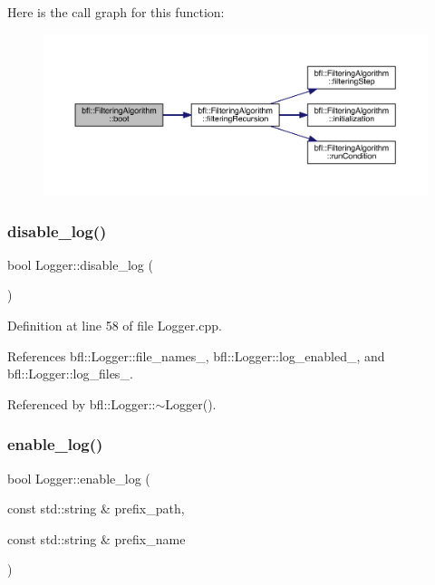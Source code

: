 Here is the call graph for this function\+:
\nopagebreak
\begin{figure}[H]
\begin{center}
\leavevmode
\includegraphics[width=350pt]{classbfl_1_1FilteringAlgorithm_a96651f8464190c0a56d79219a1017147_cgraph}
\end{center}
\end{figure}
\mbox{\label{classbfl_1_1Logger_a440467a28ccc46490d767fe0ef6f556a}} 
\subsubsection{\texorpdfstring{disable\+\_\+log()}{disable\_log()}}
{\footnotesize\ttfamily bool Logger\+::disable\+\_\+log (\begin{DoxyParamCaption}{ }\end{DoxyParamCaption})\hspace{0.3cm}{\ttfamily [inherited]}}



Definition at line 58 of file Logger.\+cpp.



References bfl\+::\+Logger\+::file\+\_\+names\+\_\+, bfl\+::\+Logger\+::log\+\_\+enabled\+\_\+, and bfl\+::\+Logger\+::log\+\_\+files\+\_\+.



Referenced by bfl\+::\+Logger\+::$\sim$\+Logger().

\mbox{\label{classbfl_1_1Logger_ae94b97b6e8d7902e8ce048384813122e}} 
\subsubsection{\texorpdfstring{enable\+\_\+log()}{enable\_log()}}
{\footnotesize\ttfamily bool Logger\+::enable\+\_\+log (\begin{DoxyParamCaption}\item[{const std\+::string \&}]{prefix\+\_\+path,  }\item[{const std\+::string \&}]{prefix\+\_\+name }\end{DoxyParamCaption})\hspace{0.3cm}{\ttfamily [inherited]}}



